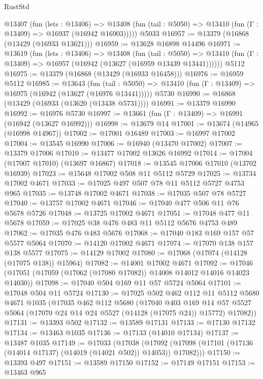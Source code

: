 \begin{lexlean}{RustStd}
\begin{coremodule}
    @13407
      (fun (lets : @13406) =>
      @13408 (fun (tail : @5050) => @13410 (fun (Γ : @13409) => @16937 (@16942 @16903)))))
    @5033
@16957 := @13379 (@16868 (@13429 (@16933 @13621)))
@16959 := @13628 @16898 @14496
@16971 := @13619
    (fun (lets : @13406) =>
    @13408
      (fun (tail : @5050) =>
      @13410 (fun (Γ : @13409) => @16957 (@16942 (@13627 (@16959 @13439 @13441))))))
    @5112
@16975 := @13379 (@16868 (@13429 (@16933 @16458)))
@16976 := @16959 @5112
@16985 := @13643
    (fun (tail : @5050) => @13410 (fun (Γ : @13409) => @16975 (@16942 (@13627 (@16976 @13441)))))
    @5730
@16990 := @16868 (@13429 (@16933 (@13620 (@13438 @5731))))
@16991 := @13379 @16990
@16992 := @16976 @5730
@16997 := @13661 (fun (Γ : @13409) => @16991 (@16942 (@13627 @16992)))
@16998 := @13679 @14
@17001 := @13674 (@14965 (@16998 @14967))
@17002 := @17001 @16489
@17003 := @16997 @17002
@17004 := @13545 @16990
@17006 := @16940 (@13470 @17002)
@17007 := @13379 @17006
@17010 := @13477 @17002 @13626 @16992
@17014 := @17004 (@17007 @17010) (@13697 @16867)
@17018 := @13545 @17006 @17010 (@13702 @16939)
@17023 := @15648 @17002 @508 @11 @5112 @5729
@17025 := @13734 @17002 @4671
@17033 := @17025 @497 @507 @78 @11 @5112 @5727 @4753 @965
@17035 := @13748 @17002 @4671
@17038 := @17035 @507 @78 @5727
@17040 := @13757 @17002 @4671
@17046 := @17040 @477 @506 @11 @76 @5678 @5726
@17048 := @13725 @17002 @4671
@17051 := @17048 @477 @11 @5678
@17059 := @17025 @38 @476 @483 @11 @5112 @5676 @4753 @489
@17062 := @17035 @476 @483 @5676
@17068 := @17040 @183 @169 @157 @57 @5577 @5064
@17070 := @14120 @17002 @4671
@17074 := @17070 @138 @157 @138 @5577
@17075 := @14129 @17002
@17080 := @17068 (@17074 (@14128 (@17075 @138)) @15964)
@17082 := @14001 @17002 @4671
@17092 := @17046 (@17051 (@17059 (@17062 (@17080 @17082)) @14008 @14012 @14016 @14023 @14030))
@17098 := @17040 @504 @169 @11 @57 @5724 @5064
@17101 := @17048 @504 @11 @5724
@17130 := @17025
    @502
    @462
    @112
    @11
    @5112
    @5680
    @4671
    @1035
    (@17035
      @462
      @112
      @5680
      (@17040
        @403
        @169
        @14
        @57
        @5527
        @5064
        (@17070 @24 @14 @24 @5527 (@14128 (@17075 @24)) @15772)
        @17082))
@17131 := @13393 @502
@17132 := @13589 @17131
@17133 := @17130 @17132
@17134 := @13463 @1035
@17136 := @17133 (@14010 @17134)
@17137 := @13487 @1035
@17149 := @17033
    (@17038
      (@17092 (@17098 (@17101 (@17136 (@14014 @17137) (@14019 (@14021 @502)) @14053)) @17082)))
@17150 := @13393 @497
@17151 := @13589 @17150
@17152 := @17149 @17151
@17153 := @13463 @965

\end{coremodule}
\end{lexlean}
